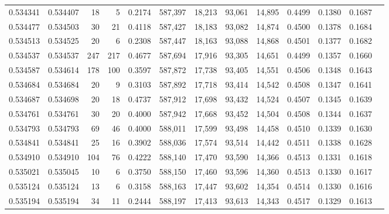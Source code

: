 \begin{tabular}{rrrrrrrrrrrrr}
0.534341 & 0.534407 &    18 &     5 &                                     0.2174 & 587,397 &  18,213 &  93,061 &  14,895 & 0.4499 & 0.1380 & 0.1687 \\
0.534477 & 0.534503 &    30 &    21 &                                     0.4118 & 587,427 &  18,183 &  93,082 &  14,874 & 0.4500 & 0.1378 & 0.1684 \\
0.534513 & 0.534525 &    20 &     6 &                                     0.2308 & 587,447 &  18,163 &  93,088 &  14,868 & 0.4501 & 0.1377 & 0.1682 \\
0.534537 & 0.534537 &   247 &   217 &                                     0.4677 & 587,694 &  17,916 &  93,305 &  14,651 & 0.4499 & 0.1357 & 0.1660 \\
0.534587 & 0.534614 &   178 &   100 &                                     0.3597 & 587,872 &  17,738 &  93,405 &  14,551 & 0.4506 & 0.1348 & 0.1643 \\
0.534684 & 0.534684 &    20 &     9 &                                     0.3103 & 587,892 &  17,718 &  93,414 &  14,542 & 0.4508 & 0.1347 & 0.1641 \\
0.534687 & 0.534698 &    20 &    18 &                                     0.4737 & 587,912 &  17,698 &  93,432 &  14,524 & 0.4507 & 0.1345 & 0.1639 \\
0.534761 & 0.534761 &    30 &    20 &                                     0.4000 & 587,942 &  17,668 &  93,452 &  14,504 & 0.4508 & 0.1344 & 0.1637 \\
0.534793 & 0.534793 &    69 &    46 &                                     0.4000 & 588,011 &  17,599 &  93,498 &  14,458 & 0.4510 & 0.1339 & 0.1630 \\
0.534841 & 0.534841 &    25 &    16 &                                     0.3902 & 588,036 &  17,574 &  93,514 &  14,442 & 0.4511 & 0.1338 & 0.1628 \\
0.534910 & 0.534910 &   104 &    76 &                                     0.4222 & 588,140 &  17,470 &  93,590 &  14,366 & 0.4513 & 0.1331 & 0.1618 \\
0.535021 & 0.535045 &    10 &     6 &                                     0.3750 & 588,150 &  17,460 &  93,596 &  14,360 & 0.4513 & 0.1330 & 0.1617 \\
0.535124 & 0.535124 &    13 &     6 &                                     0.3158 & 588,163 &  17,447 &  93,602 &  14,354 & 0.4514 & 0.1330 & 0.1616 \\
0.535194 & 0.535194 &    34 &    11 &                                     0.2444 & 588,197 &  17,413 &  93,613 &  14,343 & 0.4517 & 0.1329 & 0.1613 \\

\end{tabular}
